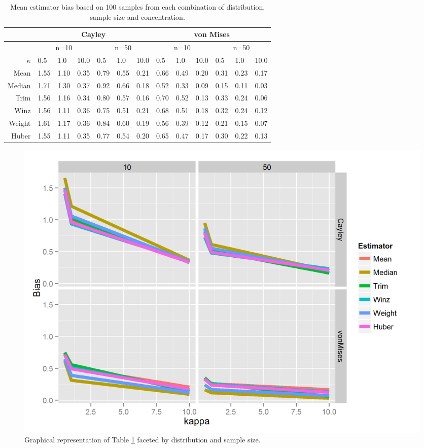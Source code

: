 \documentclass{article}\usepackage[]{graphicx}\usepackage[]{color}
\begin{document}
\begin{table}[ht]
\centering
\begin{tabular}{r|lll|lll|lll|lll}
  \hline
 & \multicolumn{6}{|c|}{Cayley} & \multicolumn{6}{|c|}{von Mises}   \\ 
\hline
   &  \multicolumn{3}{|c|}{n=10} & \multicolumn{3}{|c|}{n=50} & \multicolumn{3}{|c|}{n=10} & \multicolumn{3}{|c|}{n=50} \\ 
  $\kappa$ &  0.5 &  1.0 & 10.0 &  0.5 &  1.0 & 10.0 &  0.5 &  1.0 & 10.0 &  0.5 &  1.0 & 10.0 \\ \hline
  Mean & 1.55 & 1.10 & 0.35 & 0.79 & 0.55 & 0.21 & 0.66 & 0.49 & 0.20 & 0.31 & 0.23 & 0.17 \\ 
  Median & 1.71 & 1.30 & 0.37 & 0.92 & 0.66 & 0.18 & 0.52 & 0.33 & 0.09 & 0.15 & 0.11 & 0.03 \\ 
  Trim & 1.56 & 1.16 & 0.34 & 0.80 & 0.57 & 0.16 & 0.70 & 0.52 & 0.13 & 0.33 & 0.24 & 0.06 \\ 
  Winz & 1.56 & 1.11 & 0.36 & 0.75 & 0.51 & 0.21 & 0.68 & 0.51 & 0.18 & 0.32& 0.24 & 0.12 \\ 
  Weight & 1.61 & 1.17 & 0.36 & 0.84 & 0.60 & 0.19& 0.56 & 0.39 & 0.12 & 0.21 & 0.15 & 0.07\\ 
  Huber & 1.55 & 1.11 & 0.35 & 0.77 & 0.54 & 0.20 & 0.65 & 0.47 & 0.17 & 0.30 & 0.22 & 0.13 \\ 
   \hline
\end{tabular}
\caption{Mean estimator bias based on 100 samples from each combination of distribution, sample size and concentration.}
\label{tab:SimRes}
\end{table}

\begin{figure}
\centering
\includegraphics[width=.7\textwidth]{Estimator.png}
\caption{Graphical representation of Table \ref{tab:SimRes} faceted by distribution and sample size.}
\end{figure}
\end{document}
